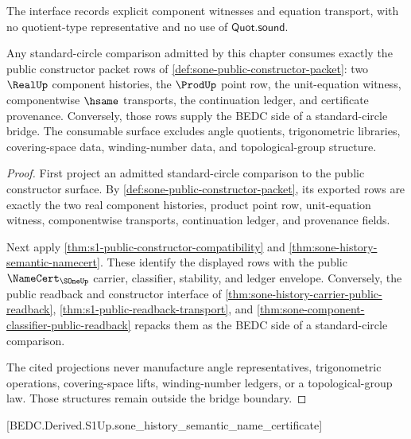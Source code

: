 \begin{remark}
\label{rem:s1-zero-axiom-note}
The interface records explicit component witnesses and equation transport, with no quotient-type representative and no use of $\mathsf{Quot.sound}$.
\end{remark}

\begin{theorem}
\label{thm:sone-public-constructor-standard-bridge}
Any standard-circle comparison admitted by this chapter consumes exactly the
public constructor packet rows of
\autoref{def:sone-public-constructor-packet}: two $\RealUp$ component histories,
the $\ProdUp$ point row, the unit-equation witness, componentwise $\hsame$
transports, the continuation ledger, and certificate provenance. Conversely,
those rows supply the BEDC side of a standard-circle bridge. The consumable
surface excludes angle quotients, trigonometric libraries, covering-space data,
winding-number data, and topological-group structure.
\end{theorem}
\begin{proof}
First project an admitted standard-circle comparison to the public constructor
surface. By \autoref{def:sone-public-constructor-packet}, its exported rows are
exactly the two real component histories, product point row, unit-equation
witness, componentwise transports, continuation ledger, and provenance fields.

Next apply \autoref{thm:s1-public-constructor-compatibility} and
\autoref{thm:sone-history-semantic-namecert}. These identify the displayed rows
with the public $\NameCert_{\SOneUp}$ carrier, classifier, stability, and ledger
envelope. Conversely, the public readback and constructor interface of
\autoref{thm:sone-history-carrier-public-readback},
\autoref{thm:s1-public-readback-transport}, and
\autoref{thm:sone-component-classifier-public-readback} repacks them as the
BEDC side of a standard-circle comparison.

The cited projections never manufacture angle representatives, trigonometric
operations, covering-space lifts, winding-number ledgers, or a topological-group
law. Those structures remain outside the bridge boundary.
\end{proof}
[BEDC.Derived.S1Up.sone\_history\_semantic\_name\_certificate]
